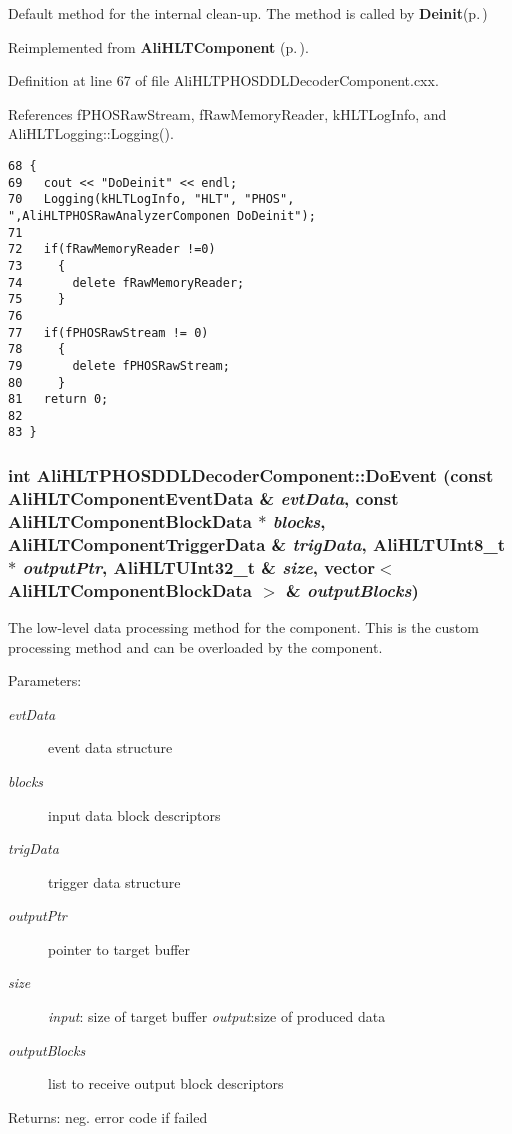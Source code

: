 Default method for the internal clean-up. The method is called by {\bf Deinit}{\rm (p.\,\pageref{classAliHLTPHOSDDLDecoderComponent_a5})} 

Reimplemented from {\bf Ali\-HLTComponent} {\rm (p.\,\pageref{classAliHLTComponent_b6})}.

Definition at line 67 of file Ali\-HLTPHOSDDLDecoder\-Component.cxx.

References f\-PHOSRaw\-Stream, f\-Raw\-Memory\-Reader, k\-HLTLog\-Info, and Ali\-HLTLogging::Logging().

\footnotesize\begin{verbatim}68 {
69   cout << "DoDeinit" << endl;
70   Logging(kHLTLogInfo, "HLT", "PHOS", ",AliHLTPHOSRawAnalyzerComponen DoDeinit");
71 
72   if(fRawMemoryReader !=0)
73     {
74       delete fRawMemoryReader;
75     }
76     
77   if(fPHOSRawStream != 0)
78     {
79       delete fPHOSRawStream;
80     }
81   return 0;
82 
83 }
\end{verbatim}\normalsize 


\subsubsection{\setlength{\rightskip}{0pt plus 5cm}int Ali\-HLTPHOSDDLDecoder\-Component::Do\-Event (const {\bf Ali\-HLTComponent\-Event\-Data} \& {\em evt\-Data}, const {\bf Ali\-HLTComponent\-Block\-Data} $\ast$ {\em blocks}, {\bf Ali\-HLTComponent\-Trigger\-Data} \& {\em trig\-Data}, {\bf Ali\-HLTUInt8\_\-t} $\ast$ {\em output\-Ptr}, {\bf Ali\-HLTUInt32\_\-t} \& {\em size}, vector$<$ {\bf Ali\-HLTComponent\-Block\-Data} $>$ \& {\em output\-Blocks})\hspace{0.3cm}{\tt  [virtual]}}\label{classAliHLTPHOSDDLDecoderComponent_a15}


The low-level data processing method for the component. This is the custom processing method and can be overloaded by the component. \begin{Desc}
\item[Parameters:]
\begin{description}
\item[{\em evt\-Data}]event data structure \item[{\em blocks}]input data block descriptors \item[{\em trig\-Data}]trigger data structure \item[{\em output\-Ptr}]pointer to target buffer \item[{\em size}]{\em input\/}: size of target buffer {\em output\/}:size of produced data \item[{\em output\-Blocks}]list to receive output block descriptors \end{description}
\end{Desc}
\begin{Desc}
\item[Returns:]neg. error code if failed \end{Desc}


